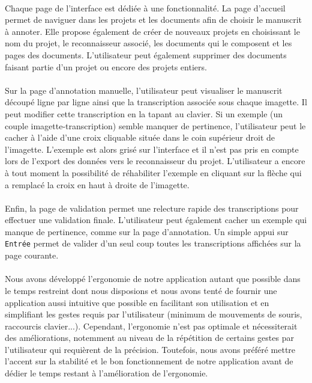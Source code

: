 \paragraph{}
Chaque page de l'interface est dédiée à une fonctionnalité. La page d'accueil permet de naviguer dans les projets et les documents afin de choisir le manuscrit à annoter. Elle propose également de créer de nouveaux projets en choisissant le nom du projet, le reconnaisseur associé, les documents qui le composent et les pages des documents. L'utilisateur peut également supprimer des documents faisant partie d'un projet ou encore des projets entiers.

\paragraph{}
Sur la page d'annotation manuelle, l'utilisateur peut visualiser le manuscrit découpé ligne par ligne ainsi que la transcription associée sous chaque imagette. Il peut modifier cette transcription en la tapant au clavier. Si un exemple (un couple imagette-transcription) semble manquer de pertinence, l'utilisateur peut le cacher à l'aide d'une croix cliquable située dans le coin supérieur droit de l'imagette. L'exemple est alors grisé sur l'interface et il n'est pas pris en compte lors de l'export des données vers le reconnaisseur du projet. L'utilisateur a encore à tout moment la possibilité de réhabiliter l'exemple en cliquant sur la flèche qui a remplacé la croix en haut à droite de l'imagette.

\paragraph{}
Enfin, la page de validation permet une relecture rapide des transcriptions pour effectuer une validation finale. L'utilisateur peut également cacher un exemple qui manque de pertinence, comme sur la page d'annotation. Un simple appui sur \texttt{Entrée} permet de valider d'un seul coup toutes les transcriptions affichées sur la page courante.

\paragraph{}
Nous avons développé l'ergonomie de notre application autant que possible dans le temps restreint dont nous disposions et nous avons tenté de fournir une application aussi intuitive que possible en facilitant son utilisation et en simplifiant les gestes requis par l'utilisateur (minimum de mouvements de souris, raccourcis clavier...). Cependant, l'ergonomie n'est pas optimale et nécessiterait des améliorations, notemment au niveau de la répétition de certains gestes par l'utilisateur qui requièrent de la précision. Toutefois, nous avons préféré mettre l'accent sur la stabilité et le bon fonctionnement de notre application avant de dédier le temps restant à l'amélioration de l'ergonomie.

